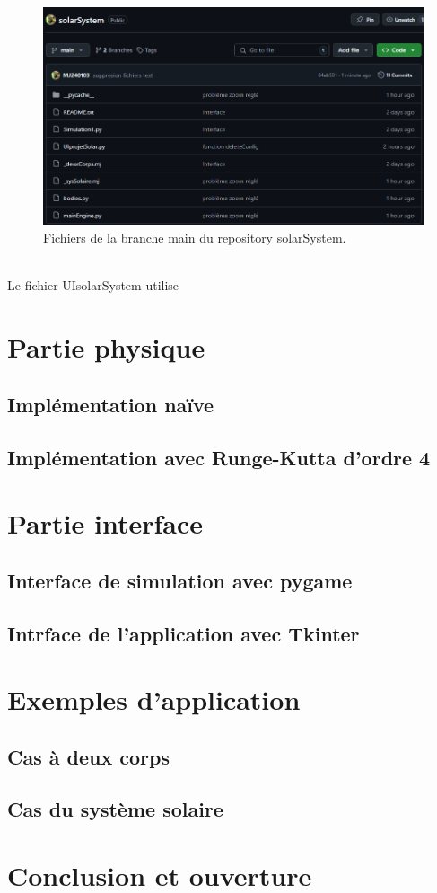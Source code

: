 \documentclass{article}
\begin{document}
    \\

    \begin{figure}[h]
        \centering
        \includegraphics[width=0.5\linewidth]{imgGitHub.png}
        \caption{\label{fig:Git}Fichiers de la branche main du repository solarSystem.}
    \end{figure}

    \\
    
    Le fichier UIsolarSystem utilise

\section{Partie physique}
    \subsection{Implémentation naïve}

    \subsection{Implémentation avec Runge-Kutta d'ordre 4}

\section{Partie interface}
    \subsection{Interface de simulation avec pygame}

    \subsection{Intrface de l'application avec Tkinter}

\section{Exemples d'application}
    \subsection{Cas à deux corps}

    \subsection{Cas du système solaire}

\section{Conclusion et ouverture}
\end{document}
